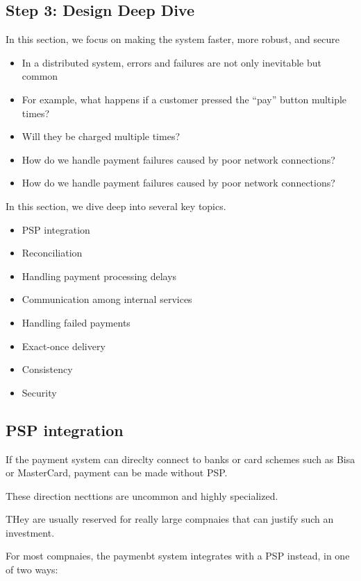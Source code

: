 \documentclass{report}
\theoremstyle{definition}
\let\oldsubsection\subsection
\renewcommand{\subsection}{\oldsubsection*}
\begin{document}
\subsection{Step 3: Design Deep Dive}

In this section, we focus on making the system faster, more robust, and secure

\begin{itemize}
\item
In a distributed system, errors and failures are not only inevitable but common
\item
For example, what happens if a customer pressed the ``pay'' button multiple times?
\item
Will they be charged multiple times?
\item
How do we handle payment failures caused by poor network connections?
\item
How do we handle payment failures caused by poor network connections?
\end{itemize}

In this section, we dive deep into several key topics.

\begin{itemize}
\item
PSP integration
\item
Reconciliation
\item
Handling payment processing delays
\item
Communication among internal services
\item
Handling failed payments
\item
Exact-once delivery
\item
Consistency
\item
Security
\end{itemize}

\subsection{PSP integration}

If the payment system can direclty connect to banks or card schemes such as Bisa or MasterCard, payment can be made without PSP.

These direction necttions are uncommon and highly specialized.

THey are usually reserved for really large compnaies that can justify such an investment.

For most compnaies, the paymenbt system integrates with a PSP instead, in one of two ways:
\end{document}
